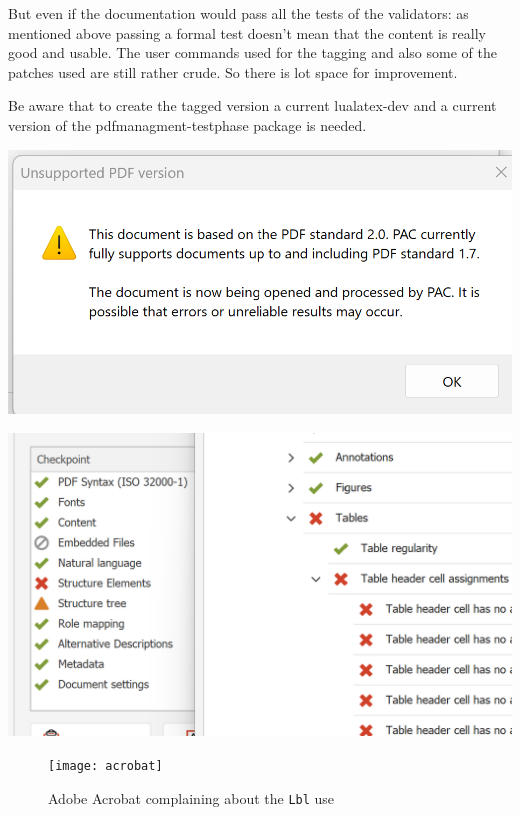 \documentclass[bibliography=totoc,a4paper]{article}
\begin{document}
But even if the documentation would pass all the tests of the validators:  as 
mentioned above passing a formal test doesn't mean that the content is really 
good and usable. The user commands used for the tagging and also some of the 
patches used are still rather crude. So there is lot space for improvement. 

\begin{tcolorbox}[]
Be aware that to create the tagged version a current lualatex-dev and a 
current version of the pdfmanagment-testphase package is needed. 
\end{tcolorbox}

\includegraphics[alt=PAC 2024 complains about PDF version]{pac2024-version}

\includegraphics[alt=PAC 2024 complains about table header cells]{pac2024-report}

\begin{figure}

\texttt{[image: acrobat]}

\caption{Adobe Acrobat complaining
about the \texttt{Lbl} use}\label{fig:adobe}\par

\end{figure}
\end{document}
